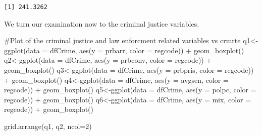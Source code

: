\documentclass[]{article}
\newenvironment{Shaded}{}{}
\newcommand{\CommentTok}[1]{\textcolor[rgb]{0.00,0.50,0.00}{#1}}
\newcommand{\DataTypeTok}[1]{#1}
\newcommand{\DecValTok}[1]{#1}
\newcommand{\KeywordTok}[1]{\textcolor[rgb]{0.00,0.00,1.00}{#1}}
\newcommand{\NormalTok}[1]{#1}
\newcommand{\OperatorTok}[1]{#1}
\newcommand{\StringTok}[1]{\textcolor[rgb]{0.00,0.50,0.50}{#1}}
\begin{document}
\begin{verbatim}
[1] 241.3262
\end{verbatim}

We turn our examination now to the criminal justice variables.

\begin{Shaded}
\begin{Highlighting}[]
\CommentTok{#Plot of the criminal justice and law enforcment related variables vs crmrte}
\NormalTok{q1<-}\KeywordTok{ggplot}\NormalTok{(}\DataTypeTok{data =}\NormalTok{ dfCrime, }\KeywordTok{aes}\NormalTok{(}\DataTypeTok{y =}\NormalTok{ prbarr, }\DataTypeTok{color =}\NormalTok{ regcode)) }\OperatorTok{+}
\StringTok{      }\KeywordTok{geom_boxplot}\NormalTok{()}
\NormalTok{q2<-}\KeywordTok{ggplot}\NormalTok{(}\DataTypeTok{data =}\NormalTok{ dfCrime, }\KeywordTok{aes}\NormalTok{(}\DataTypeTok{y =}\NormalTok{ prbconv, }\DataTypeTok{color =}\NormalTok{ regcode)) }\OperatorTok{+}
\StringTok{      }\KeywordTok{geom_boxplot}\NormalTok{()}
\NormalTok{q3<-}\KeywordTok{ggplot}\NormalTok{(}\DataTypeTok{data =}\NormalTok{ dfCrime, }\KeywordTok{aes}\NormalTok{(}\DataTypeTok{y =}\NormalTok{ prbpris, }\DataTypeTok{color =}\NormalTok{ regcode)) }\OperatorTok{+}
\StringTok{      }\KeywordTok{geom_boxplot}\NormalTok{()}
\NormalTok{q4<-}\KeywordTok{ggplot}\NormalTok{(}\DataTypeTok{data =}\NormalTok{ dfCrime, }\KeywordTok{aes}\NormalTok{(}\DataTypeTok{y =}\NormalTok{ avgsen, }\DataTypeTok{color =}\NormalTok{ regcode)) }\OperatorTok{+}
\StringTok{      }\KeywordTok{geom_boxplot}\NormalTok{()}
\NormalTok{q5<-}\KeywordTok{ggplot}\NormalTok{(}\DataTypeTok{data =}\NormalTok{ dfCrime, }\KeywordTok{aes}\NormalTok{(}\DataTypeTok{y =}\NormalTok{ polpc, }\DataTypeTok{color =}\NormalTok{ regcode)) }\OperatorTok{+}
\StringTok{      }\KeywordTok{geom_boxplot}\NormalTok{()}
\NormalTok{q6<-}\KeywordTok{ggplot}\NormalTok{(}\DataTypeTok{data =}\NormalTok{ dfCrime, }\KeywordTok{aes}\NormalTok{(}\DataTypeTok{y =}\NormalTok{ mix, }\DataTypeTok{color =}\NormalTok{ regcode)) }\OperatorTok{+}
\StringTok{      }\KeywordTok{geom_boxplot}\NormalTok{()}

\KeywordTok{grid.arrange}\NormalTok{(q1, q2, }\DataTypeTok{ncol=}\DecValTok{2}\NormalTok{)}
\end{Highlighting}
\end{Shaded}
\end{document}
